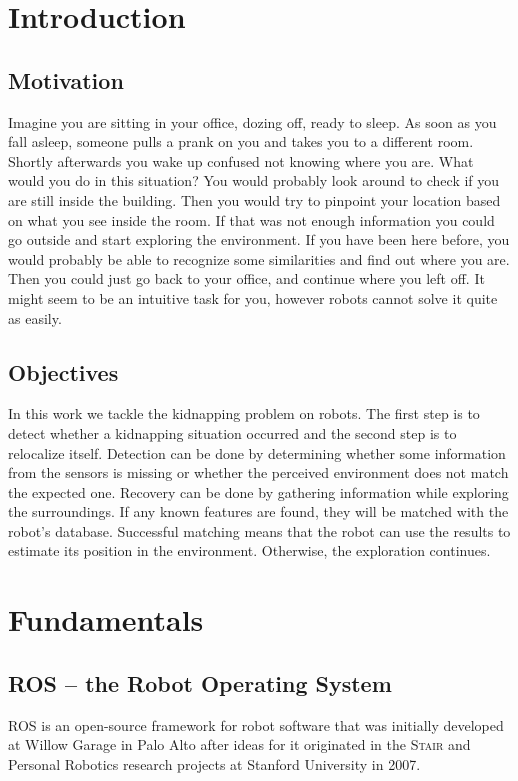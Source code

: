 \chapter{Introduction}
\section{Motivation}

Imagine you are sitting in your office, dozing off, ready to sleep. As soon as you fall asleep, someone pulls a prank on you and takes you to a different room. Shortly afterwards you wake up confused not knowing where you are. What would you do in this situation? You would probably look around to check if you are still inside the building. Then you would try to pinpoint your location based on what you see inside the room. If that was not enough information you could go outside and start exploring the environment. If you have been here before, you would probably be able to recognize some similarities and find out where you are. Then you could just go back to your office, and continue where you left off. It might seem to be an intuitive task for you, however robots cannot solve it quite as easily.

\section{Objectives}

In this work we tackle the kidnapping problem on robots. The first step is to detect whether a kidnapping situation occurred and the second step is to relocalize itself. Detection can be done by determining whether some information from the sensors is missing or whether the perceived environment does not match the expected one. Recovery can be done by gathering  information while exploring the surroundings. If any known features are found, they will be matched with the robot's database. Successful matching means that the robot can use the results to estimate its position in the environment. Otherwise, the exploration continues.

\chapter{Fundamentals}
\section{ROS -- the Robot Operating System}
ROS is an open-source framework for robot software that was initially developed at Willow Garage in Palo Alto after ideas for it originated in the \textsc{Stair} and Personal Robotics research projects at Stanford University in 2007. 

